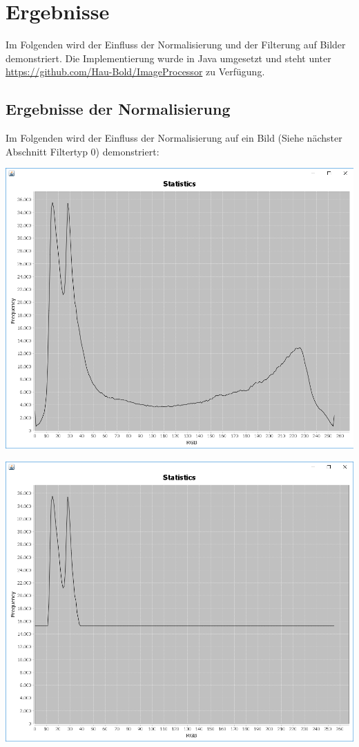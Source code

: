\documentclass[a4paper,12pt]{article}
\begin{document}
\section{Ergebnisse}
Im Folgenden wird der Einfluss der Normalisierung und der Filterung auf Bilder demonstriert.
Die Implementierung wurde in Java umgesetzt und steht unter \url{https://github.com/Hau-Bold/ImageProcessor} zu Verfügung.
\subsection{Ergebnisse der Normalisierung}
Im Folgenden wird der Einfluss der Normalisierung auf ein Bild (Siehe nächster Abschnitt Filtertyp 0) demonstriert:
\par
\hspace{1.5cm}
\begin{center}
\includegraphics[width=0.8\linewidth,height=0.7\textheight]{Normalization/unnormalized}
\end{center}
\begin{center}
\includegraphics[width=0.8\linewidth,height=0.7\textheight]{Normalization/normalized}
\end{center}
\end{document}
